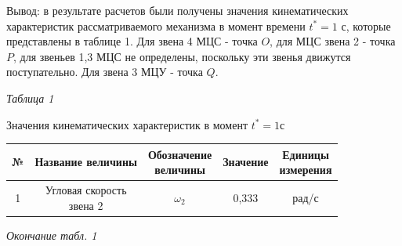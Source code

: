 \documentclass{article}
\begin{document}
\medskip
Вывод: в результате расчетов были получены значения кинематических характеристик рассматриваемого механизма в момент времени $t^*=1$ с, которые представлены в таблице 1. Для звена 4 МЦС - точка $O$, для МЦС звена 2 - точка $P$, для звеньев 1,3 МЦС не определены, поскольку эти звенья движутся поступательно. Для звена 3 МЦУ - точка $Q$.

\begin{flushright}
  \small\textit{Таблица 1} \hspace*{0.4cm}
\end{flushright}

\vspace*{-0.9cm}

\begin{center}
  Значения кинематических характеристик в момент $t^*=1$с
\end{center}

\begin{tabular}{|c|c|c|c|c|}
  \hline
  \rule{0pt}{1cm} № & \hspace*{0.5cm} Название величины \hspace*{0.5cm} & \makecell{Обозначение\\ величины} & Значение & \makecell{Единицы\\ измерения} \\[0.5cm]
  \hline
  \rule{0pt}{1cm} 1  & \makecell{Угловая скорость\\звена 2} & $\omega_2$ & 0,333 & рад/с \\[0.5cm]
  
  \hline
\end{tabular}
\newpage
\begin{flushright}
  \small\textit{Окончание табл. 1} \hspace*{0.4cm}
\end{flushright}
\end{document}
